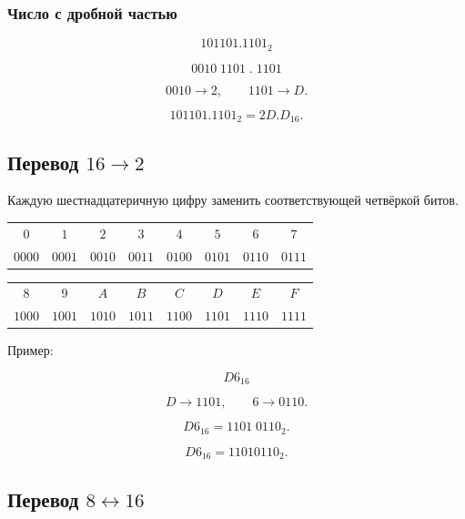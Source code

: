 \documentclass[../final.tex]{subfiles}
\begin{document}
\subsubsection{Число с дробной частью}

\[
101101.1101_2
\]

\[
0010\;1101
\;.\;
1101
\]

\[
0010\longrightarrow2,
\qquad
1101\longrightarrow D.
\]

\[
101101.1101_2=2D.D_{16}.
\]



\subsection{Перевод \texorpdfstring{$16 \to 2$}{16 → 2}}

Каждую шестнадцатеричную цифру заменить соответствующей
четвёркой битов.

\medskip

\begin{center}
\renewcommand{\arraystretch}{1.2}
\begin{tabular}{cccccccc}
$0$ & $1$ & $2$ & $3$ &
$4$ & $5$ & $6$ & $7$ \\

$0000$ & $0001$ & $0010$ & $0011$ &
$0100$ & $0101$ & $0110$ & $0111$
\end{tabular}

\vspace{2mm}

\begin{tabular}{cccccccc}
$8$ & $9$ & $A$ & $B$ &
$C$ & $D$ & $E$ & $F$ \\

$1000$ & $1001$ & $1010$ & $1011$ &
$1100$ & $1101$ & $1110$ & $1111$
\end{tabular}
\end{center}

Пример:

\[
D6_{16}
\]

\[
D\longrightarrow1101,
\qquad
6\longrightarrow0110.
\]

\[
D6_{16}
=
1101\;0110_2.
\]

\[
D6_{16}=11010110_2.
\]



\subsection{Перевод \texorpdfstring{$8 \leftrightarrow 16$}{8 ↔ 16}}
\end{document}
